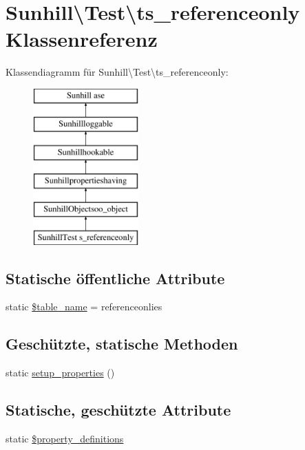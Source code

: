 \hypertarget{classSunhill_1_1Test_1_1ts__referenceonly}{}\section{Sunhill\textbackslash{}Test\textbackslash{}ts\+\_\+referenceonly Klassenreferenz}
\label{classSunhill_1_1Test_1_1ts__referenceonly}
Klassendiagramm für Sunhill\textbackslash{}Test\textbackslash{}ts\+\_\+referenceonly\+:\begin{figure}[H]
\begin{center}
\leavevmode
\includegraphics[height=6.000000cm]{d2/d8b/classSunhill_1_1Test_1_1ts__referenceonly}
\end{center}
\end{figure}
\subsection*{Statische öffentliche Attribute}
\begin{DoxyCompactItemize}
\item 
static \hyperlink{classSunhill_1_1Test_1_1ts__referenceonly_a6d0d1e5a4924e0e74a5001fb05337921}{\$table\+\_\+name} = \textquotesingle{}referenceonlies\textquotesingle{}
\end{DoxyCompactItemize}
\subsection*{Geschützte, statische Methoden}
\begin{DoxyCompactItemize}
\item 
static \hyperlink{classSunhill_1_1Test_1_1ts__referenceonly_addad3a11463cf36dfd0a0323b59854d3}{setup\+\_\+properties} ()
\end{DoxyCompactItemize}
\subsection*{Statische, geschützte Attribute}
\begin{DoxyCompactItemize}
\item 
static \hyperlink{classSunhill_1_1Test_1_1ts__referenceonly_a6755065ff402e8644a8a7fb58cf74179}{\$property\+\_\+definitions}
\end{DoxyCompactItemize}
